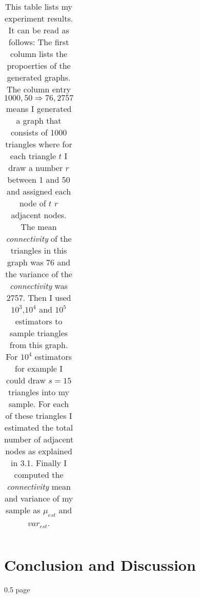 \documentclass[12pt,twoside,a4paper]{report}
\begin{document}
\begin{center}
\begin{table}
{\begin{tabular}{l|c|c|c}
\end{tabular}
}
\caption{This table lists my experiment results. It can be read as follows: The first column lists the propoerties of the generated graphs. The column entry $1000, 50 \Rightarrow 76,2757$ means I generated a graph that consists of 1000 triangles where for each triangle $t$ I draw a number $r$ between 1 and 50 and assigned each node of $t$ $r$ adjacent nodes. The mean \textit{connectivity} of the triangles in this graph was 76 and the variance of the \textit{connectivity} was 2757. Then I used $10^3$,$10^4$ and $10^5$ estimators to sample triangles from this graph. For $10^4$ estimators for example I could draw $s=15$ triangles into my sample. For each of these triangles I estimated the total number of adjacent nodes as explained in 3.1. Finally I computed the \textit{connectivity} mean and variance of my sample as $\mu_{est}$ and $var_{est}$.}
\end{table}
\end{center}
\section{Conclusion and Discussion}
0.5 page
\end{document}
